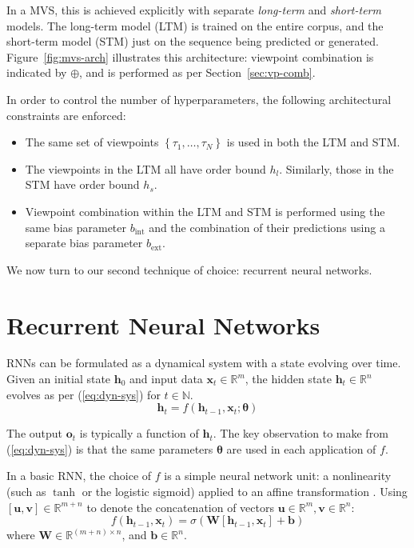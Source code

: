 \documentclass[12pt,a4paper,twoside,openright]{report}
\newcommand{\sref}[1]{Section~\ref{#1}}
\newcommand{\set}[1]{ \left\{ #1 \right\} }
\newcommand{\vect}[1]{\boldsymbol{\mathbf{#1}}}
\begin{document}
In a MVS, this is achieved explicitly with separate \emph{long-term} and
\emph{short-term} models. The long-term model (LTM) is trained on the entire
corpus, and the short-term model (STM) just on the sequence being predicted or
generated. Figure~\ref{fig:mvs-arch} illustrates this architecture: viewpoint
combination is indicated by $\oplus$, and is performed as per
\sref{sec:vp-comb}.

In order to control the number of hyperparameters, the following architectural
constraints are enforced:
\begin{itemize}
  \item The same set of viewpoints $\set{\tau_1, \ldots, \tau_N}$ is used in both
    the LTM and STM. 
  \item The viewpoints in the LTM all have order bound $h_l$. Similarly, those
    in the STM have order bound $h_s$.
  \item Viewpoint combination within the LTM and STM is performed using the same
    bias parameter $b_{\mathrm{int}}$ and the combination of their predictions
    using a separate bias parameter $b_{\mathrm{ext}}$.
\end{itemize}

\vspace{6mm}

We now turn to our second technique of choice: recurrent neural networks.

\section{Recurrent Neural Networks}\label{sec:rnn-intro}

RNNs can be formulated as a dynamical system with a state evolving over time.
Given an initial state $\vect{h}_0$ and input data $\vect{x}_t \in
\mathbb{R}^m$, the hidden state $\vect{h}_t \in \mathbb{R}^n$ evolves as per
(\ref{eq:dyn-sys}) for $t \in \mathbb{N}$.
\begin{equation}
  \vect{h}_t = f(\vect{h}_{t-1}, \vect{x}_t; \vect{\theta})
  \label{eq:dyn-sys}
\end{equation} 

The output $\vect{o}_t$ is typically a function of $\vect{h}_t$. The key
observation to make from (\ref{eq:dyn-sys}) is that the same parameters
$\vect{\theta}$ are used in each application of $f$. 

In a basic RNN, the choice of $f$ is a simple neural network unit: a
nonlinearity (such as $\tanh$ or the logistic sigmoid) applied to an affine
transformation \cite{zaremba2014recurrent}. Using
$[\vect{u},\vect{v}] \in \mathbb{R}^{m+n}$ to denote the concatenation of
vectors $\vect{u} \in \mathbb{R}^m, \vect{v} \in \mathbb{R}^n$: 
$$f(\vect{h}_{t-1}, \vect{x}_t) = \sigma(\vect{W}[\vect{h}_{t-1}, 
\vect{x}_t] + \vect{b})$$ 
where $\vect{W} \in \mathbb{R}^{(m+n) \times n}$, and $\vect{b} \in
\mathbb{R}^n$. 
\end{document}
